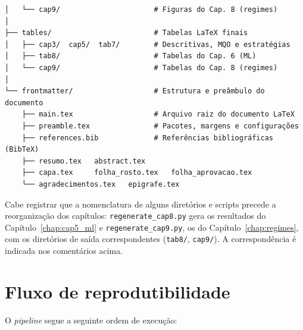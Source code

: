 \begin{verbatim}
│   └── cap9/                      # Figuras do Cap. 8 (regimes)
│
├── tables/                        # Tabelas LaTeX finais
│   ├── cap3/  cap5/  tab7/        # Descritivas, MQO e estratégias
│   ├── tab8/                      # Tabelas do Cap. 6 (ML)
│   └── cap9/                      # Tabelas do Cap. 8 (regimes)
│
└── frontmatter/                   # Estrutura e preâmbulo do documento
    ├── main.tex                   # Arquivo raiz do documento LaTeX
    ├── preamble.tex               # Pacotes, margens e configurações
    ├── references.bib             # Referências bibliográficas (BibTeX)
    ├── resumo.tex   abstract.tex
    ├── capa.tex     folha_rosto.tex   folha_aprovacao.tex
    └── agradecimentos.tex   epigrafe.tex
\end{verbatim}

Cabe registrar que a nomenclatura de alguns diretórios e scripts precede a
reorganização dos capítulos: \texttt{regenerate\_cap8.py} gera os
resultados do Capítulo~\ref{chap:cap5_ml} e \texttt{regenerate\_cap9.py},
os do Capítulo~\ref{chap:regimes}, com os diretórios de saída
correspondentes (\texttt{tab8/}, \texttt{cap9/}). A correspondência é
indicada nos comentários acima.

\section{Fluxo de reprodutibilidade}

O \textit{pipeline} segue a seguinte ordem de execução:

